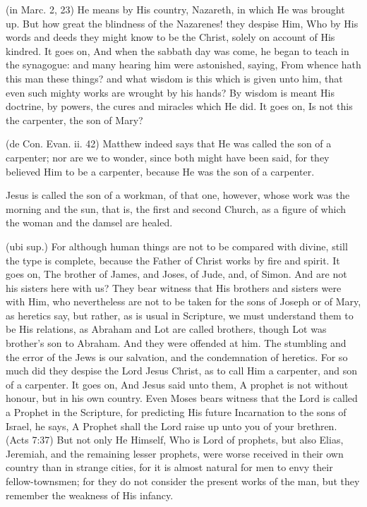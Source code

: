  (in Marc. 2, 23) He means by His country, Nazareth, in which He was brought up. But how great the blindness of the Nazarenes! they despise Him, Who by His words and deeds they might know to be the Christ, solely on account of His kindred. It goes on, And when the sabbath day was come, he began to teach in the synagogue: and many hearing him were astonished, saying, From whence hath this man these things? and what wisdom is this which is given unto him, that even such mighty works are wrought by his hands? By wisdom is meant His doctrine, by powers, the cures and miracles which He did. It goes on, Is not this the carpenter, the son of Mary?

 (de Con. Evan. ii. 42) Matthew indeed says that He was called the son of a carpenter; nor are we to wonder, since both might have been said, for they believed Him to be a carpenter, because He was the son of a carpenter.

 Jesus is called the son of a workman, of that one, however, whose work was the morning and the sun, that is, the first and second Church, as a figure of which the woman and the damsel are healed.

 (ubi sup.) For although human things are not to be compared with divine, still the type is complete, because the Father of Christ works by fire and spirit. It goes on, The brother of James, and Joses, of Jude, and, of Simon. And are not his sisters here with us? They bear witness that His brothers and sisters were with Him, who nevertheless are not to be taken for the sons of Joseph or of Mary, as heretics say, but rather, as is usual in Scripture, we must understand them to be His relations, as Abraham and Lot are called brothers, though Lot was brother’s son to Abraham. And they were offended at him. The stumbling and the error of the Jews is our salvation, and the condemnation of heretics. For so much did they despise the Lord Jesus Christ, as to call Him a carpenter, and son of a carpenter. It goes on, And Jesus said unto them, A prophet is not without honour, but in his own country. Even Moses bears witness that the Lord is called a Prophet in the Scripture, for predicting His future Incarnation to the sons of Israel, he says, A Prophet shall the Lord raise up unto you of your brethren. (Acts 7:37) But not only He Himself, Who is Lord of prophets, but also Elias, Jeremiah, and the remaining lesser prophets, were worse received in their own country than in strange cities, for it is almost natural for men to envy their fellow-townsmen; for they do not consider the present works of the man, but they remember the weakness of His infancy.


